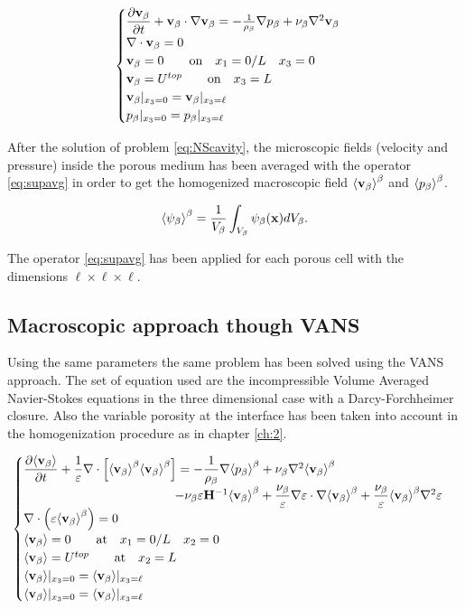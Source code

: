 \begin{eqnarray}
\begin{cases}
\dfrac{\partial \textbf{v}_{\beta}}{\partial t} + \textbf{v}_{\beta} \cdot \nabla \textbf{v}_{\beta} = -\frac{1}{\rho_{\beta}} \nabla p_{\beta} + \nu_{\beta} \nabla^2  \textbf{v}_{\beta} \\
\nabla \cdot \textbf{v}_{\beta} = 0\\
\textbf{v}_{\beta} = 0 \qquad \text{on} \quad x_1 = 0/L \quad x_3 = 0 \\
\textbf{v}_{\beta} = U^{top} \qquad \text{on} \quad x_3 = L\\
\textbf{v}_{\beta}|_{x_3 = 0} = \textbf{v}_{\beta}|_{x_3 = \ell}  \\
p_{\beta}|_{x_3 = 0} = p_{\beta}|_{x_3 = \ell}
\end{cases}
\label{eq:NScavity}
\end{eqnarray}

After the solution of problem \eqref{eq:NScavity}, the microscopic fields (velocity and pressure) inside the porous medium has been averaged with the operator \ref{eq:supavg} in order to get the homogenized macroscopic field ${\left< \textbf{v}_{\beta} \right>}^{\beta}$ and ${\left< p_{\beta} \right>}^{\beta}$.

\begin{equation}
	{\left< \psi_{\beta} \right>}^{\beta} = \dfrac{1}{V_\beta} \int_{V_\beta} \psi_\beta (\mathbf{x}) d V_\beta.
	\label{eq:supavg}
\end{equation}

The operator \eqref{eq:supavg} has been applied for each porous cell with the dimensions $\ell \times \ell \times \ell$.


\subsection{Macroscopic approach though VANS}
Using the same parameters the same problem has been solved using the VANS approach.
The set of equation used are the incompressible Volume Averaged Navier-Stokes equations in the three dimensional case with a Darcy-Forchheimer closure.
Also the variable porosity at the interface has been taken into account in the homogenization procedure as in chapter \ref{ch:2}.

\begin{eqnarray}
\begin{cases}
\dfrac{\partial {\left< \textbf{v}_{\beta} \right>}}{\partial t} + \dfrac{1}{\varepsilon} \nabla \cdot \left[  {\left< \textbf{v}_{\beta} \right>}^{\beta}  {\left< \textbf{v}_{\beta} \right>}^{\beta} \right] = -\dfrac{1}{\rho_{\beta}} \nabla {\left< p_{\beta}\right>}^{\beta} + \nu_{\beta} \nabla^2 {\left< \textbf{v}_{\beta} \right>}^{\beta} \\ 
\qquad \qquad \qquad \qquad \qquad \qquad- \nu_{\beta} \varepsilon \mathbf{H}^{-1} {\left< \textbf{v}_{\beta} \right>}^{\beta} +\dfrac{\nu_{\beta}}{\varepsilon} \nabla \varepsilon \cdot \nabla {\left< \textbf{v}_{\beta} \right>}^{\beta} + \dfrac{\nu_{\beta}}{\varepsilon} {\left< \textbf{v}_{\beta} \right>}^{\beta} \nabla^2 \varepsilon \\
\nabla \cdot \left(\varepsilon {\left< \textbf{v}_{\beta} \right>}^{\beta} \right) = 0\\
{\left< \textbf{v}_{\beta} \right>} = 0 \qquad \textrm{at} \quad x_1 = 0/L \quad x_2 = 0\\
{\left< \textbf{v}_{\beta} \right>} = U^{top} \qquad \textrm{at} \quad x_2 = L\\
{\left< \textbf{v}_{\beta} \right>}|_{x_3 = 0} = {\left< \textbf{v}_{\beta} \right>}|_{x_3 = \ell} \\
{\left< \textbf{v}_{\beta} \right>}|_{x_3 = 0} = {\left< \textbf{v}_{\beta} \right>}|_{x_3 = \ell} 
\end{cases}
\end{eqnarray}

